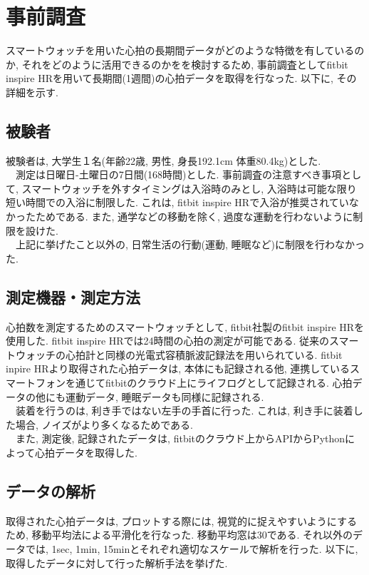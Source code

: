 \documentclass[report, 11pt, a4paper]{jsbook}
\begin{document}
\chapter{事前調査}
スマートウォッチを用いた心拍の長期間データがどのような特徴を有しているのか, それをどのように活用できるのかをを検討するため, 事前調査としてfitbit inspire HRを用いて長期間(1週間)の心拍データを取得を行なった. 以下に, その詳細を示す.

\section{被験者}
被験者は, 大学生１名(年齢22歳, 男性, 身長192.1cm 体重80.4kg)とした.\\
　測定は日曜日-土曜日の7日間(168時間)とした. 事前調査の注意すべき事項として, スマートウォッチを外すタイミングは入浴時のみとし, 入浴時は可能な限り短い時間での入浴に制限した. これは, fitbit inspire HRで入浴が推奨されていなかったためである. また, 通学などの移動を除く, 過度な運動を行わないように制限を設けた. \\
　上記に挙げたこと以外の, 日常生活の行動(運動, 睡眠など)に制限を行わなかった. 

\section{測定機器・測定方法}
心拍数を測定するためのスマートウォッチとして, fitbit社製のfitbit inspire HRを使用した. fitbit inspire HRでは24時間の心拍の測定が可能である. 従来のスマートウォッチの心拍計と同様の光電式容積脈波記録法を用いられている. fitbit inpire HRより取得された心拍データは, 本体にも記録される他, 連携しているスマートフォンを通じてfitbitのクラウド上にライフログとして記録される. 心拍データの他にも運動データ, 睡眠データも同様に記録される.\\
　装着を行うのは, 利き手ではない左手の手首に行った. これは, 利き手に装着した場合, ノイズがより多くなるためである. \\
　また, 測定後, 記録されたデータは, fitbitのクラウド上からAPIからPythonによって心拍データを取得した. 

\section{データの解析}
取得された心拍データは, プロットする際には, 視覚的に捉えやすいようにするため, 移動平均法による平滑化を行なった. 移動平均窓は30である. それ以外のデータでは, 1sec, 1min, 15minとそれぞれ適切なスケールで解析を行った. 以下に, 取得したデータに対して行った解析手法を挙げた.
\end{document}
